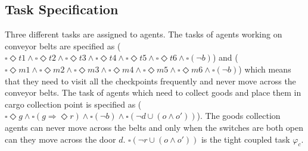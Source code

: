 \documentclass[journal]{IEEEtran}
\begin{document}
\subsection{Task Specification}
Three different tasks are assigned to agents. The tasks of agents working on conveyor belts are specified as ($\square\Diamond t1 \wedge \square\Diamond t2 \wedge \square\Diamond t3 \wedge \square\Diamond t4 \wedge \square\Diamond t5 \wedge \square\Diamond t6 \wedge \square(\neg b)$) and ($\square\Diamond m1 \wedge \square\Diamond m2 \wedge \square\Diamond m3 \wedge \square\Diamond m4 \wedge \square\Diamond m5 \wedge \square\Diamond m6 \wedge \square(\neg b)$) which means that they need to visit all the checkpoints frequently and never move across the conveyor belts. The task of agents which need to collect goods and place them in cargo collection point is specified as ($\square\Diamond g \wedge \square(g\Longrightarrow \Diamond r) \wedge \square(\neg b) \wedge \square(\neg d \cup (o \wedge o'))$). The goods collection agents can never move across the belts and only when the switches are both open can they move across the door $d$. $\square(\neg r \cup (o \wedge o'))$ is the tight coupled task $\varphi_c$.
\end{document}
